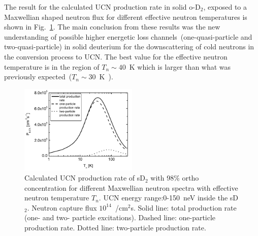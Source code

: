 
The result for the calculated UCN production rate in solid o-D$_2$,
exposed to a Maxwellian shaped neutron flux for different effective
neutron temperatures is shown in
Fig.~\ref{fig:sD2_production_rate}. The main conclusion from these
results was the new understanding of possible higher energetic loss
channels~(one-quasi-particle and two-quasi-particle) in solid
deuterium for the downscattering of cold neutrons in the conversion
process to UCN. The best value for the effective neutron temperature
is in the region of $T_n \sim 40$~K which is larger than what was
previously expected~($T_n \sim 30$~K~\cite{Yu1986}).


\begin{figure}[h!]
\begin{center}
   \includegraphics[width=0.5\textwidth]{Frei2010_P.PNG} \caption{\cite{Frei2010}
    Calculated UCN production rate of sD$_2$ with 98\% ortho
    concentration for different Maxwellian neutron spectra with
    effective neutron temperature $T_n$. UCN energy range:0-150~neV
    inside the sD$_2$. Neutron capture flux $10^{14}$~/cm$^2$s. Solid
    line: total production rate (one- and two- particle
    excitations). Dashed line: one-particle production rate. Dotted
    line: two-particle production rate.}
    \label{fig:sD2_production_rate}
    \end{center}
\end{figure} 







